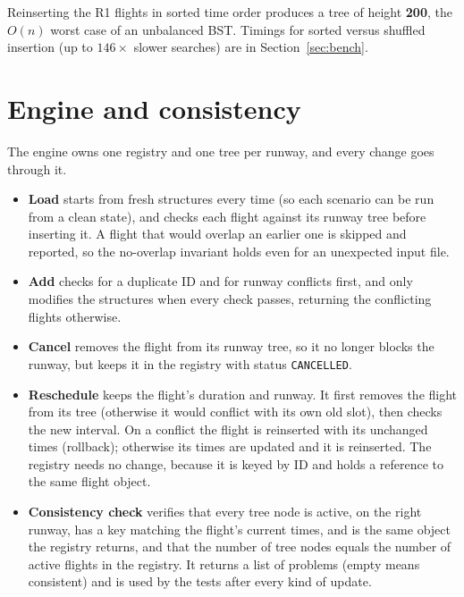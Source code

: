 \documentclass[11pt]{article}
\begin{document}
Reinserting the R1 flights in sorted time order produces a tree of height
\textbf{200}, the $O(n)$ worst case of an unbalanced BST.
Timings for sorted versus shuffled insertion (up to $146\times$ slower searches) are in Section~\ref{sec:bench}.

\section{Engine and consistency}

The engine owns one registry and one tree per runway, and every change goes
through it.

\begin{itemize}
  \item \textbf{Load} starts from fresh structures every time (so each scenario
  can be run from a clean state), and checks each flight against its runway
  tree before inserting it. A flight that would overlap an earlier one is
  skipped and reported, so the no-overlap invariant holds even for an
  unexpected input file.
  \item \textbf{Add} checks for a duplicate ID and for runway conflicts first,
  and only modifies the structures when every check passes, returning the
  conflicting flights otherwise.
  \item \textbf{Cancel} removes the flight from its runway tree, so it no longer
  blocks the runway, but keeps it in the registry with status
  \texttt{CANCELLED}.
  \item \textbf{Reschedule} keeps the flight's duration and runway. It first
  removes the flight from its tree (otherwise it would conflict with its own old
  slot), then checks the new interval. On a conflict the flight is reinserted
  with its unchanged times (rollback); otherwise its times are updated and it is
  reinserted. The registry needs no change, because it is keyed by ID and holds
  a reference to the same flight object.
  \item \textbf{Consistency check} verifies that every tree node is active, on
  the right runway, has a key matching the flight's current times, and is the
  same object the registry returns, and that the number of tree nodes equals
  the number of active flights in the registry. It returns a list of problems
  (empty means consistent) and is used by the tests after every kind of update.
\end{itemize}

\end{document}
